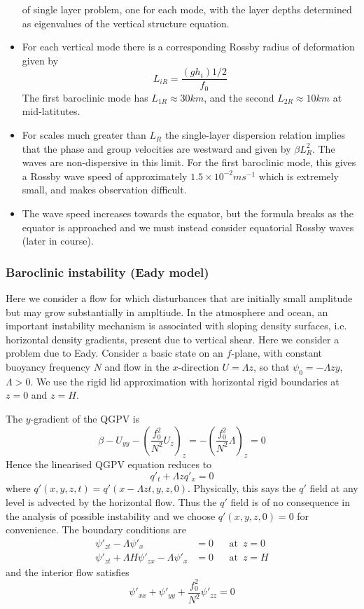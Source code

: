 \documentclass{jknotes}
\begin{document}
\begin{itemize}
		of single layer problem, one for each mode, with the layer depths
		determined as eigenvalues of the vertical structure equation.
	\item For each vertical mode there is a corresponding Rossby radius of
		deformation given by
		\begin{equation}
			L_{iR} = \frac{(gh_i){1/2}}{f_0}
		\end{equation}
		The first baroclinic mode has $L_{1R} \approx 30 km$, and the second
		$L_{2R} \approx 10 km$ at mid-latitutes.
	\item For scales much greater than $L_{R}$ the single-layer dispersion
		relation implies that the phase and group velocities are westward and
		given by $\beta L_R^2$. The waves are non-dispersive in this limit.
		For the first baroclinic mode, this gives a Rossby wave speed of
		approximately $1.5 \times 10^{-2} ms^{-1}$ which is extremely small,
		and makes observation difficult.
	\item The wave speed increases towards the equator, but the formula breaks
		as the equator is approached and we must instead consider equatorial
		Rossby waves (later in course).
\end{itemize}

\subsubsection{Baroclinic instability (Eady model)}
Here we consider a flow for which disturbances that are initially small amplitude
but may grow substantially in ampltiude.  In the atmosphere and ocean,
an important instability mechanism is associated with sloping density
surfaces, i.e. horizontal density gradients, present due to vertical shear.
Here we consider a problem due to Eady. Consider a basic state on an
$f$-plane, with constant buoyancy frequency $N$ and flow in the $x$-direction
$U = \Lambda z$, so that $\psi_0 = -\Lambda z y$, $\Lambda > 0$. We use the
rigid lid approximation with horizontal rigid boundaries at $z=0$ and $z= H$.

The $y$-gradient of the QGPV is
\begin{equation}
	\beta - U_{yy} - (\frac{f_0^2}{N^2} U_z)_z = -(\frac{f_0^2}{N^2} \Lambda)_z
	= 0
\end{equation}
Hence the linearised QGPV equation reduces to
\begin{equation}
	q'_t + \Lambda z q'_x = 0
\end{equation}
where $q'(x,y,z,t) = q'(x-\Lambda z t, y, z, 0)$. Physically, this says the
$q'$ field at any level is advected by the horizontal flow. Thus the $q'$
field is of no consequence in the analysis of possible instability and we
choose $q'(x,y,z,0)= 0$ for convenience. The boundary conditions are
\begin{align}
	\psi'_{zt} - \Lambda \psi'_x &= 0 &&\text{at}\,\,\, z=0 \\
	\psi'_{zt}+\Lambda H \psi'_{zx} - \Lambda \psi'_x &= 0 &&\text{at} \,\,\,z
	=H
\end{align}
and the interior flow satisfies
\begin{equation}
	\psi'_{xx} + \psi'_{yy} + \frac{f_0^2}{N^2} \psi'_{zz} = 0
\end{equation}
\end{document}
